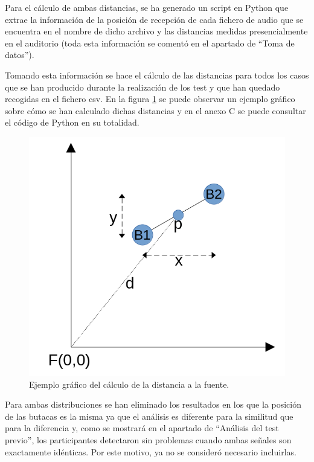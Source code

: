 \documentclass[11pt,a4paper]{book}
\begin{document}
		Para el cálculo de ambas distancias, se ha generado un script en Python que extrae la información de la posición de recepción de cada fichero de audio que se encuentra en el nombre de dicho archivo y las distancias medidas presencialmente en el auditorio (toda esta información se comentó en el apartado de ``Toma de datos'').
		
		Tomando esta información se hace el cálculo de las distancias para todos los casos que se han producido durante la realización de los test y que han quedado recogidas en el fichero csv. En la figura \ref{fig:calcDist} se puede observar un ejemplo gráfico sobre cómo se han calculado dichas distancias y en el anexo C se puede consultar el código de Python en su totalidad.
		
		\begin{figure}[H]
                \begin{center}
                    \includegraphics[scale=.4]{../imagenes/calculoDistancia.png}
                    \caption{Ejemplo gráfico del cálculo de la distancia a la fuente.}
                    \label{fig:calcDist}
                \end{center}
            \end{figure}
		
		Para ambas distribuciones se han eliminado los resultados en los que la posición de las butacas es la misma ya que el análisis es diferente para la similitud que para la diferencia y, como se mostrará en el apartado de ``Análisis del test previo'', los participantes detectaron sin problemas cuando ambas señales son exactamente idénticas. Por este motivo, ya no se consideró necesario incluirlas.
		
\end{document}
